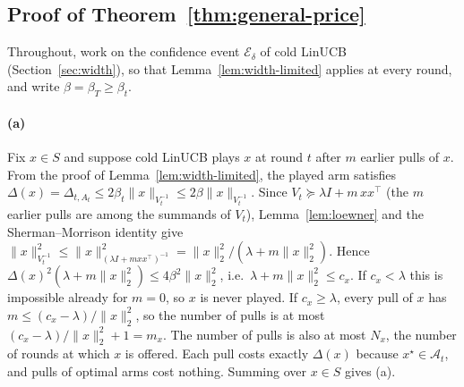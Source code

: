 \documentclass{article}
\theoremstyle{definition}
\theoremstyle{remark}
\theoremstyle{remark}
\begin{document}
\subsection{Proof of Theorem~\ref{thm:general-price}}
\label{app:proof-general-price}

Throughout, work on the confidence event $\mathcal E_\delta$ of cold LinUCB
(Section~\ref{sec:width}), so that Lemma~\ref{lem:width-limited} applies at
every round, and write $\beta=\beta_T\ge\beta_t$.

\paragraph{(a)}
Fix $x\in S$ and suppose cold LinUCB plays $x$ at round $t$ after $m$ earlier
pulls of $x$. From the proof of Lemma~\ref{lem:width-limited}, the played arm
satisfies $\Delta(x)=\Delta_{t,A_t}\le2\beta_t\|x\|_{V_t^{-1}}\le2\beta\|x\|_{V_t^{-1}}$.
Since $V_t\succeq\lambda I+m\,xx^\top$ (the $m$ earlier pulls are among the
summands of $V_t$), Lemma~\ref{lem:loewner} and the Sherman--Morrison identity
give $\|x\|^2_{V_t^{-1}}\le\|x\|^2_{(\lambda I+mxx^\top)^{-1}}=\|x\|_2^2/(\lambda+m\|x\|_2^2)$.
Hence $\Delta(x)^2(\lambda+m\|x\|_2^2)\le4\beta^2\|x\|_2^2$, i.e.\
$\lambda+m\|x\|_2^2\le c_x$. If $c_x<\lambda$ this is impossible already for
$m=0$, so $x$ is never played. If $c_x\ge\lambda$, every pull of $x$ has
$m\le(c_x-\lambda)/\|x\|_2^2$, so the number of pulls is at most
$(c_x-\lambda)/\|x\|_2^2+1=m_x$. The number of pulls is also at most $N_x$,
the number of rounds at which $x$ is offered. Each pull costs exactly
$\Delta(x)$ because $x^\star\in\mathcal A_t$, and pulls of optimal arms cost
nothing. Summing over $x\in S$ gives (a).
\end{document}
